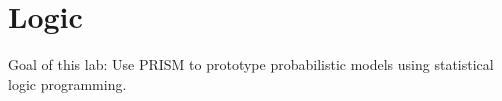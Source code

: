 \chapter{Logic}

Goal of this lab:
Use PRISM to prototype probabilistic models using statistical logic programming.


